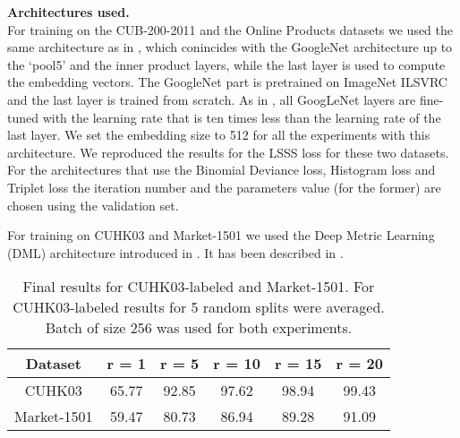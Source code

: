 \noindent\textbf{Architectures used.}\\
For training on the CUB-200-2011 and the Online Products datasets we used the same architecture as in \citep{Song16}, which conincides with the GoogleNet architecture \citep{szegedy2015going} up to the `pool5' and the inner product layers, while the last layer is used to compute the embedding vectors. The GoogleNet part is pretrained on ImageNet ILSVRC \citep{ILSVRC15} and the last layer is trained from scratch. As in \citep{Song16}, all GoogLeNet layers are fine-tuned with the learning rate that is ten times less than the learning rate of the last layer. We set the embedding size to 512 for all the experiments with this architecture. We reproduced the results for the LSSS loss  \citep{Song16} for these two datasets. For the architectures that use the Binomial Deviance loss, Histogram loss and Triplet loss the iteration number and the parameters value (for the former) are chosen using the validation set.    


For training on CUHK03 and Market-1501 we used the Deep Metric Learning (DML) architecture introduced in \citep{Yi14}. It has been described in . 

\begin{table}%
\begin{center}
\caption{Final results for CUHK03-labeled and Market-1501. For CUHK03-labeled results for 5 random splits were averaged. Batch of size 256 was used for both experiments.}\label{tab:reid}
\begin{tabular}{cccccc}\\\toprule  
Dataset      & r = 1     &  r = 5     & r = 10    & r = 15     & r = 20 \\\midrule
 CUHK03      & 65.77 & 92.85 & 97.62 &  98.94 & 99.43\\  %
 Market-1501 & 59.47 & 80.73 & 86.94 &  89.28 & 91.09 \\  \bottomrule
\end{tabular}
\end{center}
\end{table} 

